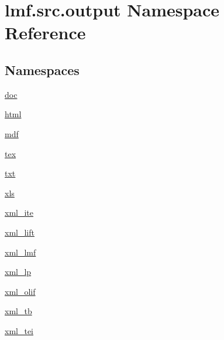 \hypertarget{namespacelmf_1_1src_1_1output}{\section{lmf.\+src.\+output Namespace Reference}
\label{namespacelmf_1_1src_1_1output}
}
\subsection*{Namespaces}
\begin{DoxyCompactItemize}
\item 
 \hyperlink{namespacelmf_1_1src_1_1output_1_1doc}{doc}
\item 
 \hyperlink{namespacelmf_1_1src_1_1output_1_1html}{html}
\item 
 \hyperlink{namespacelmf_1_1src_1_1output_1_1mdf}{mdf}
\item 
 \hyperlink{namespacelmf_1_1src_1_1output_1_1tex}{tex}
\item 
 \hyperlink{namespacelmf_1_1src_1_1output_1_1txt}{txt}
\item 
 \hyperlink{namespacelmf_1_1src_1_1output_1_1xls}{xls}
\item 
 \hyperlink{namespacelmf_1_1src_1_1output_1_1xml__ite}{xml\+\_\+ite}
\item 
 \hyperlink{namespacelmf_1_1src_1_1output_1_1xml__lift}{xml\+\_\+lift}
\item 
 \hyperlink{namespacelmf_1_1src_1_1output_1_1xml__lmf}{xml\+\_\+lmf}
\item 
 \hyperlink{namespacelmf_1_1src_1_1output_1_1xml__lp}{xml\+\_\+lp}
\item 
 \hyperlink{namespacelmf_1_1src_1_1output_1_1xml__olif}{xml\+\_\+olif}
\item 
 \hyperlink{namespacelmf_1_1src_1_1output_1_1xml__tb}{xml\+\_\+tb}
\item 
 \hyperlink{namespacelmf_1_1src_1_1output_1_1xml__tei}{xml\+\_\+tei}
\end{DoxyCompactItemize}
